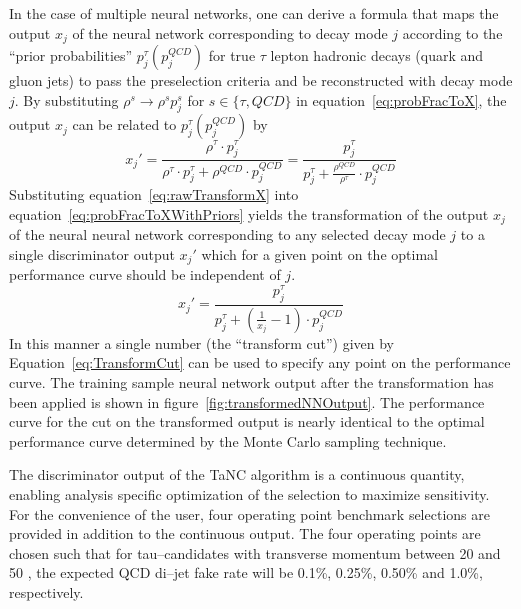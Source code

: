 In the case of multiple neural networks, one can derive a formula that maps the
output $x_j$ of the neural network corresponding to decay mode $j$ according to
the ``prior probabilities'' $p_j^\tau (p_j^{QCD})$ for true $\tau$ lepton
hadronic decays (quark and gluon jets) to pass the preselection criteria and
be reconstructed with decay mode $j$.
By substituting $\rho^s \rightarrow \rho^s p_j^s$ for $s \in \{\tau, QCD\}$ in
equation~\ref{eq:probFracToX}, the output $x_j$ can be related to $p_j^\tau
(p_j^{QCD})$ by 
\begin{equation}
   x_j' = \frac{\rho^\tau \cdot p_j^\tau} 
   {\rho^\tau \cdot p_j^\tau + \rho^{QCD} \cdot p_j^{QCD} }
   = \frac{p_j^\tau} 
   {p_j^\tau + \frac{\rho^{QCD}}{\rho^\tau} \cdot p_j^{QCD} }
   \label{eq:probFracToXWithPriors}
\end{equation}
Substituting equation~\ref{eq:rawTransformX} into
 equation~\ref{eq:probFracToXWithPriors} yields the transformation of the output
$x_j$ of the neural neural network corresponding to any selected decay mode $j$
to a single discriminator output $x_j'$ which for a given point on the optimal
performance curve should be independent of $j$.
\begin{equation}
   x_j' = \frac{p_j^\tau} 
   {p_j^\tau + \left(\frac{1}{x_j}-1\right)\cdot p_j^{QCD} }
   \label{eq:TransformCut}
\end{equation}
In this manner a single number (the ``transform cut'') given by
Equation~\ref{eq:TransformCut} can be used to specify any point on the
performance curve.  The training sample neural network output after the
transformation has been applied is shown in
figure~\ref{fig:transformedNNOutput}.  The performance curve for the cut on the
transformed output is nearly identical to the optimal performance curve
determined by the Monte Carlo sampling technique. 

The discriminator output of the TaNC algorithm is a continuous quantity,
enabling analysis specific optimization of the selection to maximize
sensitivity.  For the convenience of the user, four operating point benchmark
selections are provided in addition to the continuous output. The four operating
points are chosen such that for tau--candidates with transverse momentum between
20 and 50 \GeVc, the expected QCD di--jet fake rate will be 0.1\%, 0.25\%,
0.50\% and 1.0\%, respectively.  

